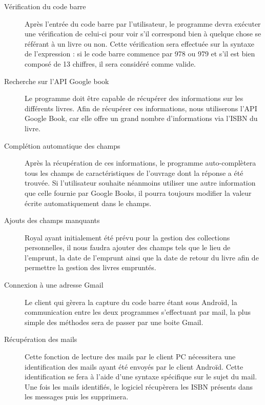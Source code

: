 \begin{description}
\item[Vérification du code barre]
	Après l'entrée du code barre par l'utilisateur, le programme devra exécuter une vérification de celui-ci pour voir s'il correspond bien à quelque chose se référant à un livre ou non. 
	Cette vérification sera effectuée sur la syntaxe de l'expression : si le code barre commence par 978 ou 979 et s'il est bien composé de 13 chiffres, il sera considéré comme valide. 

\item[Recherche sur l'API Google book]
	Le programme doit être capable de récupérer des informations sur les différents livres.
	Afin de récupérer ces informations, nous utiliserons l'API Google Book, car elle offre un grand nombre d'informations via l'ISBN du livre.

\item[Complétion automatique des champs]
	Après la récupération de ces informations, le programme auto-complètera tous les champs de caractéristiques de l'ouvrage dont la réponse a été trouvée.
	Si l'utilisateur souhaite néanmoins utiliser une autre information que celle fournie par Google Books, il pourra toujours modifier la valeur écrite automatiquement dans le champs.

\item[Ajouts des champs manquants]
	Royal ayant initialement été prévu pour la gestion des collections personnelles, il nous faudra ajouter des champs tels que le lieu de l'emprunt, la date de l'emprunt ainsi que la date de retour du livre afin de permettre la gestion des livres empruntés. 

\item[Connexion à une adresse Gmail]
	Le client qui gèrera la capture du code barre étant sous Androïd, la communication entre les deux programmes s'effectuant par mail, la plus simple des méthodes sera de passer par une boite Gmail.

\item[Récupération des mails]
	Cette fonction de lecture des mails par le client PC nécessitera une identification des mails ayant été envoyés par le client Androïd. 
	Cette identification se fera à l'aide d'une syntaxe spécifique sur le sujet du mail. Une fois les mails identifiés, le logiciel récupèrera les ISBN présents dans les messages puis les supprimera.  

\end{description}
